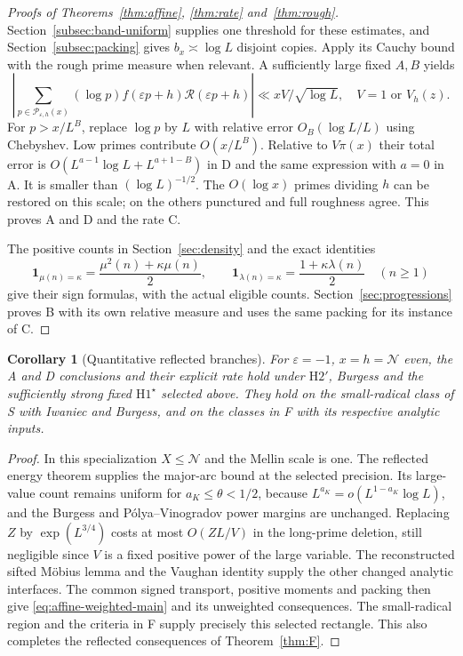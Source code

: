 \documentclass[11pt]{article}
\newtheorem{corollary}[theorem]{Corollary}
\theoremstyle{definition}
\newcommand{\ind}{\mathbf 1}
\newcommand{\GN}{\mathcal N}
\theoremstyle{remark}
\numberwithin{equation}{section}
\begin{document}
\begin{proof}[Proofs of Theorems~\ref{thm:affine}, \ref{thm:rate} and~\ref{thm:rough}]
Section~\ref{subsec:band-uniform} supplies one threshold for
these estimates, and Section~\ref{subsec:packing} gives
$b_x\asymp\log L$ disjoint copies. Apply its Cauchy bound
with the rough prime measure when relevant. A sufficiently large
fixed $A,B$ yields
\begin{equation}\label{eq:affine-weighted-main}
 \left|\sum_{p\in\mathcal P_{\varepsilon,h}(x)}(\log p)
 f(\varepsilon p+h)\mathcal R(\varepsilon p+h)\right|
       \ll xV/\sqrt{\log L},
 \quad V=1\text{ or }V_h(z).
\end{equation}
For $p>x/L^B$, replace $\log p$ by $L$ with relative error
$O_B(\log L/L)$ using Chebyshev. Low primes contribute
$O(x/L^B)$. Relative to $V\pi(x)$ their total error is
$O(L^{a-1}\log L+L^{a+1-B})$ in D and the same expression
with $a=0$ in A. It is smaller than $(\log L)^{-1/2}$.
The $O(\log x)$ primes dividing $h$ can be restored on this
scale; on the others punctured and full roughness agree.
This proves A and D and the rate C.

The positive counts in Section~\ref{sec:density} and the exact
identities
\begin{equation}\label{eq:general-signs}
 \ind_{\mu(n)=\kappa}=\frac{\mu^2(n)+\kappa\mu(n)}2,
 \qquad
 \ind_{\lambda(n)=\kappa}=\frac{1+\kappa\lambda(n)}2
 \quad(n\ge1)
\end{equation}
give their sign formulas, with the actual eligible counts.
Section~\ref{sec:progressions} proves B with its own relative
measure and uses the same packing for its instance of C.
\end{proof}

\begin{corollary}[Quantitative reflected branches]\label{cor:reflected-v2}
For $\varepsilon=-1$, $x=h=\GN$ even, the A and D conclusions
and their explicit rate hold under $\mathrm H2'$, Burgess and
the sufficiently strong fixed $\mathrm H1^\star$ selected above.
They hold on the small-radical class of S with Iwaniec and Burgess,
and on the classes in F with its respective analytic inputs.
\end{corollary}
\begin{proof}
In this specialization $X\le\GN$ and the Mellin scale is one.
The reflected energy theorem supplies the major-arc bound at
the selected precision. Its large-value count remains uniform
for $a_K\le\theta<1/2$, because
$L^{a_K}=o(L^{1-a_K}\log L)$, and the Burgess and
P\'olya--Vinogradov power margins are unchanged. Replacing $Z$
by $\exp(L^{3/4})$ costs at most $O(ZL/V)$ in the long-prime
deletion, still negligible since $V$ is a fixed positive power
of the large variable. The reconstructed sifted M\"obius lemma
and the Vaughan identity supply the other changed analytic
interfaces. The common signed transport, positive moments and
packing then give \eqref{eq:affine-weighted-main} and its unweighted
consequences. The small-radical region and the criteria in F
supply precisely this selected rectangle. This also completes
the reflected consequences of Theorem~\ref{thm:F}.
\end{proof}
\end{document}
